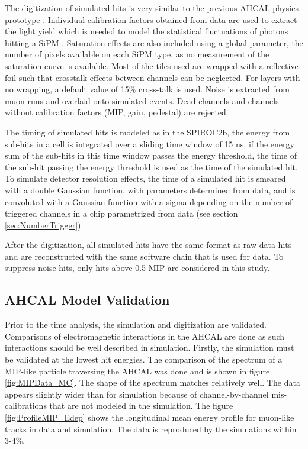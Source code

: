 \documentclass{JINST}
\begin{document}
The digitization of simulated hits is very similar to the previous AHCAL physics prototype \cite{1748-0221-5-05-P05004}. Individual calibration factors obtained from data are used to extract the light yield which is needed to model the statistical fluctuations of photons hitting a SiPM \cite{Hartbrich:2016bbz}. Saturation effects are also included using a global parameter, the number of pixels available on each SiPM type, as no measurement of the saturation curve is available. Most of the tiles used are wrapped with a reflective foil such that crosstalk effects between channels can be neglected. For layers with no wrapping, a default value of 15\% cross-talk is used. Noise is extracted from muon runs and overlaid onto simulated events. Dead channels and channels without calibration factors (MIP, gain, pedestal) are rejected.

The timing of simulated hits is modeled as in the SPIROC2b, the energy from sub-hits in a cell is integrated over a sliding time window of 15 ns, if the energy sum of the sub-hits in this time window passes the energy threshold, the time of the sub-hit passing the energy threshold is used as the time of the simulated hit. To simulate detector resolution effects, the time of a simulated hit is smeared with a double Gaussian function, with parameters determined from data, and is convoluted with a Gaussian function with a sigma depending on the number of triggered channels in a chip parametrized from data (see section \ref{sec:NumberTrigger}).

After the digitization, all simulated hits have the same format as raw data hits and are reconstructed with the same software chain that is used for data. To suppress noise hits, only hits above 0.5 MIP are considered in this study.

\subsection{AHCAL Model Validation}

Prior to the time analysis, the simulation and digitization are validated. Comparisons of electromagnetic interactions in the AHCAL are done as such interactions should be well described in simulation. Firstly, the simulation must be validated at the lowest hit energies. The comparison of the spectrum of a MIP-like particle traversing the AHCAL was done and is shown in figure \ref{fig:MIPData_MC}. The shape of the spectrum matches relatively well. The data appears slightly wider than for simulation because of channel-by-channel mis-calibrations that are not modeled in the simulation. The figure \ref{fig:ProfileMIP_Edep} shows the longitudinal mean energy profile for muon-like tracks in data and simulation. The data is reproduced by the simulations within 3-4\%.
\end{document}

